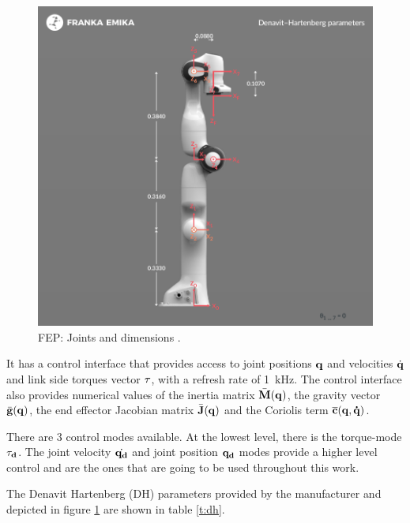 \begin{figure}[H]
    \caption[FEP's kinematic chain]{
        FEP: Joints and dimensions \cite{FrankaEmikaPanda}.
    }
    \begin{center}
    \includegraphics[width=\textwidth]{figs/panda-dh-diagram.png}
    \end{center}
\label{fig:FEPchain}
\end{figure}



It has a control interface that provides access to joint positions $\bf{q}$ and velocities $\dot{\bf{q}}$ and link side torques vector $\bf{\tau}$, with a refresh rate of \SI{1}{\kilo\hertz}. The control interface also provides numerical values of the inertia matrix \(\bar{\bf{M}}(\bf{q})\), the gravity vector \( \bar{\bf{g}}(\bf{q}) \), the end effector Jacobian matrix \( \bar{\bf{J}}(\bf{q}) \) and the Coriolis term \( \overline{\bf{c}}(\bf{q}, \dot{\bf{q}}) \).

There are 3 control modes available. At the lowest level, there is the torque-mode $\bf{\tau_d}$. The joint velocity $\dot{\bf{q_d}}$ and joint position $\bf{q_d}$ modes provide a higher level control and are the ones that are going to be used throughout this work.

The Denavit Hartenberg (DH) parameters provided by the manufacturer \cite{FrankaEmikaPanda} and depicted in figure \ref{fig:FEPchain} are shown in table \ref{t:dh}.

